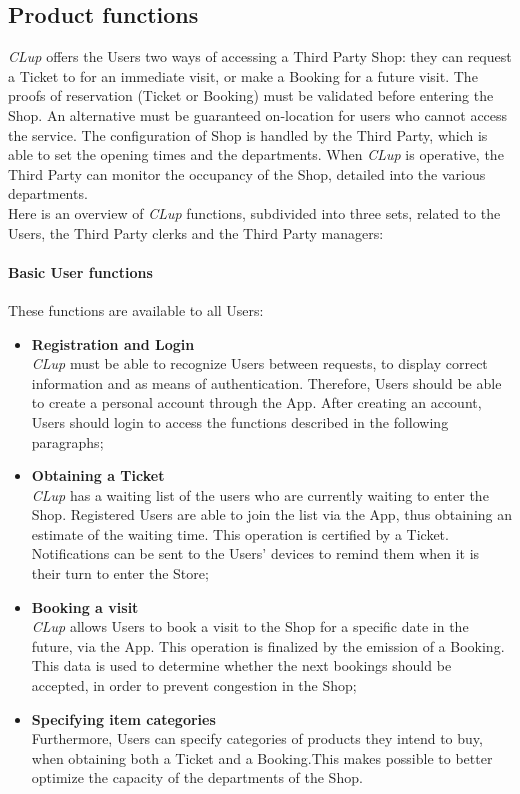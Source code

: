\subsection{Product functions}
\emph{CLup} offers the Users two ways of accessing a Third Party Shop: they can request a Ticket to for an immediate visit, or make a Booking for a future visit. The proofs of reservation (Ticket or Booking) must be validated before entering the Shop. An alternative must be guaranteed on-location for users who cannot access the service.
The configuration of Shop is handled by the Third Party, which is able to set the opening times and the departments. When \emph{CLup} is operative, the Third Party can monitor the occupancy of the Shop, detailed into the various departments.
\\Here is an overview of \emph{CLup} functions, subdivided into three sets, related to the Users, the Third Party clerks and the Third Party managers:

\paragraph{Basic User functions} These functions are available to all Users:
\begin{itemize}
    \item \textbf{Registration and Login}\\
    \emph{CLup} must be able to recognize Users between requests, to display correct information and as means of authentication. Therefore, Users should be able to create a personal account through the App. After creating an account, Users should login to access the functions described in the following paragraphs;
    \item \textbf{Obtaining a Ticket}\\
    \emph{CLup} has a waiting list of the users who are currently waiting to enter the Shop. Registered Users are able to join the list via the App, thus obtaining an estimate of the waiting time. This operation is certified by a Ticket. Notifications can be sent to the Users' devices to remind them when it is their turn to enter the Store;
    \item\textbf{Booking a visit}\\
    \emph{CLup} allows Users to book a visit to the Shop for a specific date in the future, via the App. This operation is finalized by the emission of a Booking. This data is used to determine whether the next bookings should be accepted, in order to prevent congestion in the Shop;
    \item\textbf{Specifying item categories}\\
    Furthermore, Users can specify categories of products they intend to buy, when obtaining both a Ticket and a Booking.This makes possible to better optimize the capacity of the departments of the Shop.
    \end{itemize}
    
